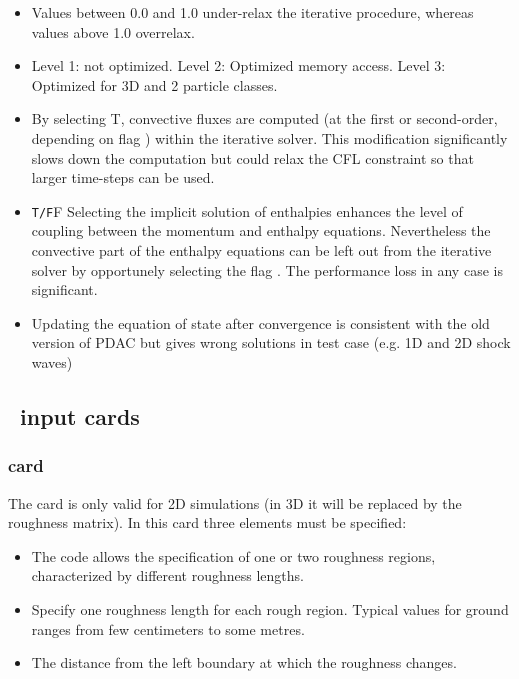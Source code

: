 \begin{itemize}
\item
{}
{Values between 0.0 and 1.0 under-relax the iterative procedure, whereas
values above 1.0 overrelax.}

\item
{}
{Level 1: not optimized. Level 2: Optimized memory access. Level 3: Optimized for 3D and 2 particle classes.}

\item
{}
{By selecting T, convective fluxes are computed (at the first or second-order, 
depending on flag ) within the iterative solver. This modification
significantly slows down the computation but could relax the CFL constraint
so that larger time-steps can be used.}

\item
{}
{{\tt T/F}}{F}
{Selecting the implicit solution of enthalpies enhances the level of coupling
between the momentum and enthalpy equations. Nevertheless the convective part 
of the enthalpy equations can be left out from the iterative solver
by opportunely selecting the flag . The performance loss
in any case is significant.}

\item
{}
{Updating the equation of state after convergence is consistent with the old
version of PDAC but gives wrong solutions in test case (e.g. 1D and 2D shock waves)}
\end{itemize}

\subsection{\PDAC\ input cards}
\label{section:cards}
\subsubsection{ card}

The  card is only valid for 2D 
simulations (in 3D it will be replaced by the roughness matrix). In this
card three elements must be specified:
\begin{itemize}
\item
{}
{The code allows the specification of one or two roughness regions, characterized
by different roughness lengths.}

\item
{}
{Specify one roughness length for each rough region. Typical values for ground
ranges from few centimeters to some metres.}

\item
{}
{The distance from the left boundary at which the roughness changes.}

\end{itemize}

